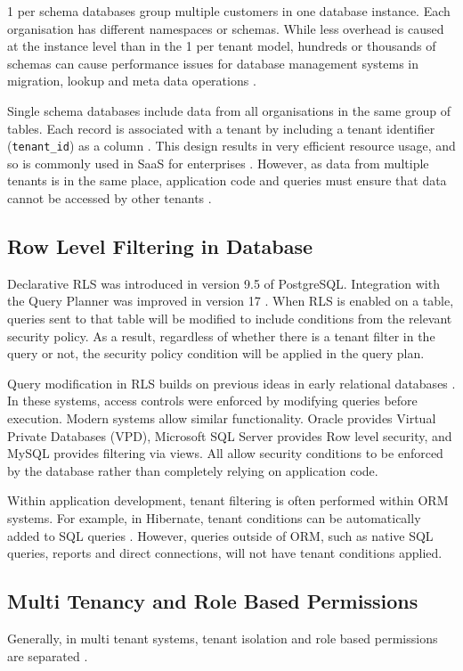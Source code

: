 \documentclass[conference]{IEEEtran}
\begin{document}
1 per schema databases group multiple customers in one database instance. Each organisation has different namespaces or schemas. While less overhead is caused at the instance level than in the 1 per tenant model, hundreds or thousands of schemas can cause performance issues for database management systems in migration, lookup and meta data operations \cite{weissman2009}.

Single schema databases include data from all organisations in the same group of tables. Each record is associated with a tenant by including a tenant identifier (\texttt{tenant\_id}) as a column \cite{aulbach2008, guo2007}. This design results in very efficient resource usage, and so is commonly used in SaaS for enterprises \cite{krebs2012, schiller2011}. However, as data from multiple tenants is in the same place, application code and queries must ensure that data cannot be accessed by other tenants \cite{narasayya2022}.

\subsection{Row Level Filtering in Database}
Declarative RLS was introduced in version 9.5 of PostgreSQL. Integration with the Query Planner was improved in version 17 \cite{postgresql17docs, postgresql17notes}. When RLS is enabled on a table, queries sent to that table will be modified to include conditions from the relevant security policy. As a result, regardless of whether there is a tenant filter in the query or not, the security policy condition will be applied in the query plan.

Query modification in RLS builds on previous ideas in early relational databases \cite{stonebraker1974}. In these systems, access controls were enforced by modifying queries before execution. Modern systems allow similar functionality. Oracle provides Virtual Private Databases (VPD), Microsoft SQL Server provides Row level security, and MySQL provides filtering via views. All allow security conditions to be enforced by the database rather than completely relying on application code.

Within application development, tenant filtering is often performed within ORM systems. For example, in Hibernate, tenant conditions can be automatically added to SQL queries \cite{hibernate2025}. However, queries outside of ORM, such as native SQL queries, reports and direct connections, will not have tenant conditions applied.

\subsection{Multi Tenancy and Role Based Permissions}
Generally, in multi tenant systems, tenant isolation and role based permissions are separated \cite{sandhu1996, ferraiolo2001}.
\end{document}
